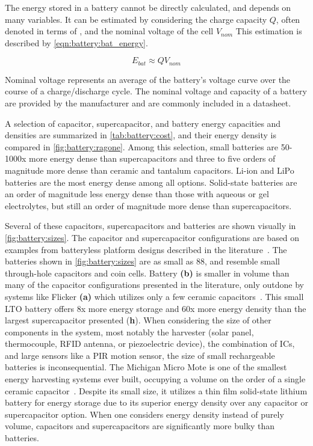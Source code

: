 The energy stored in a battery cannot be directly calculated, and depends on many variables. It can be estimated by considering the charge capacity $Q$, often denoted in terms of \si{\Ah}, and the nominal voltage of the cell $V_{nom}$
This estimation is described by \cref{eqn:battery:bat_energy}.

\begin{equation} \label{eqn:battery:bat_energy}
E_{bat} \approx Q V_{nom}
\end{equation}

\noindent Nominal voltage represents an average of the battery's voltage curve over the course of a charge/discharge cycle. The nominal voltage and capacity of a battery are provided by the manufacturer and are commonly included in a datasheet.


A selection of capacitor, supercapacitor, and battery energy capacities and densities are summarized in \cref{tab:battery:cost}, and their energy density is compared in \cref{fig:battery:ragone}. Among this selection, small batteries are 50-1000x more energy dense than supercapacitors and three to five orders of magnitude more dense than ceramic and tantalum capacitors. Li-ion and LiPo batteries are the most energy dense among all options. Solid-state batteries are an order of magnitude less energy dense than those with aqueous or gel electrolytes, but still an order of magnitude more dense than supercapacitors. 

Several of these capacitors, supercapacitors and batteries are shown visually in \cref{fig:battery:sizes}.
The capacitor and supercapacitor configurations are based on examples from batteryless platform designs described in the literature~\cite{hesterFlicker17, campbellEnergy14,colinReconfigurable18}.
The batteries shown in \cref{fig:battery:sizes} are
as small as 88\ssi{\milli\meter\cubed}, and resemble small through-hole
capacitors and coin cells. Battery \textbf{(b)} is smaller in volume than many of the capacitor
configurations presented in the literature, only outdone by systems like Flicker \textbf{(a)} which utilizes only a few ceramic capacitors~\cite{hesterFlicker17}.
This small LTO battery offers 8x 
more energy storage and 60x more energy density than the largest supercapacitor presented (\textbf{h}). When considering the size of other components in the system, most notably the harvester (solar panel, thermocouple, RFID antenna, or piezoelectric device), the combination of ICs, and large sensors like a PIR motion sensor, the size of small rechargeable batteries is inconsequential. 
The Michigan Micro Mote is one of the smallest energy harvesting systems ever built, occupying a volume on the order of a single ceramic capacitor~\cite{lee2013modular}. Despite its small size, it utilizes a thin film solid-state lithium battery for energy storage due to its superior energy density over any capacitor or supercapacitor option.
When one considers energy density instead of purely volume, capacitors and supercapacitors are significantly more bulky than batteries.

